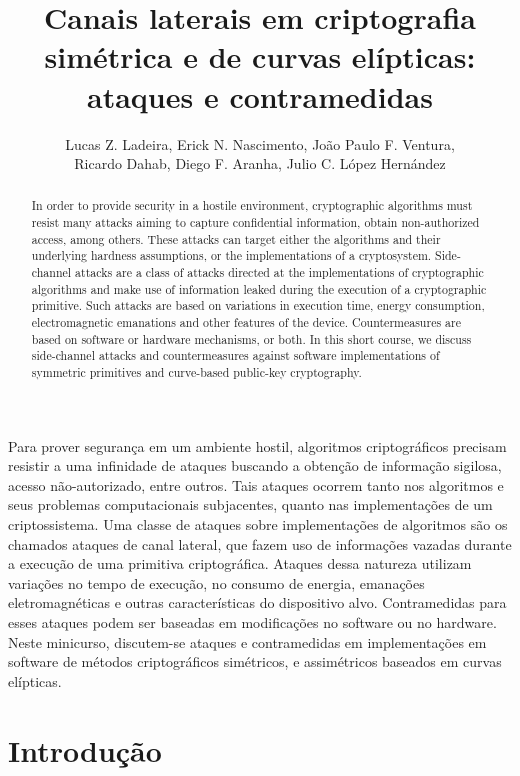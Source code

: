 \documentclass{SBCbookchapter}
\title{Canais laterais em criptografia simétrica e de curvas elípticas: ataques e contramedidas}
\author{Lucas Z. Ladeira, Erick N. Nascimento, João Paulo F. Ventura,\\ Ricardo Dahab, Diego F. Aranha, Julio C. López Hernández}
\begin{document}
 
\setcounter{chapter}{3}
\maketitle
     
\begin{resumo}
Para prover segurança em um ambiente hostil, algoritmos criptográficos precisam resistir a uma infinidade de ataques buscando a obtenção de informação sigilosa, acesso não-autorizado, entre outros. Tais ataques ocorrem tanto nos algoritmos e seus problemas computacionais subjacentes, quanto nas implementações de um criptossistema. Uma classe de ataques sobre implementações de algoritmos são os chamados ataques de canal lateral, que fazem uso de informações vazadas durante a execução de uma primitiva criptográfica. Ataques dessa natureza utilizam variações no tempo de execução, no consumo de energia, emanações eletromagnéticas e outras características do dispositivo alvo. Contramedidas para esses ataques podem ser baseadas em modificações no software ou no hardware. Neste minicurso, discutem-se ataques e contramedidas em  implementações em software de métodos criptográficos simétricos, e assimétricos baseados em curvas elípticas.
\end{resumo}

\begin{abstract}
In order to provide security in a hostile environment, cryptographic algorithms must resist many attacks aiming to capture confidential information, obtain non-authorized access, among others. These attacks can target either the algorithms and their underlying hardness assumptions, or the implementations of a cryptosystem. Side-channel attacks are a class of attacks directed at the implementations of  cryptographic algorithms  and make use of information leaked during the execution of a cryptographic primitive. Such attacks are based on variations in execution time, energy consumption, electromagnetic emanations and other features of the device. Countermeasures are based on software or hardware mechanisms, or both. In this short course, we discuss side-channel attacks and countermeasures against software implementations of symmetric primitives and curve-based public-key cryptography.
\end{abstract}


%
\section{Introdução}
\end{document}
